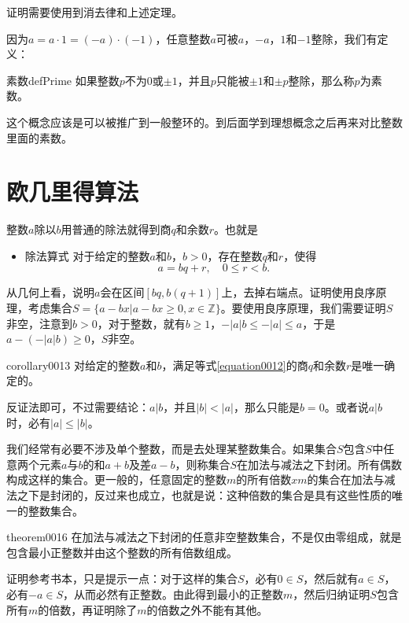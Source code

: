 证明需要使用到消去律和上述定理。

因为$a=a \cdot 1 = (-a) \cdot (-1)$，任意整数$a$可被$a$，$-a$，$1$和$-1$整除，我们有定义：
\begin{definition}{素数}{defPrime}
如果整数$p$不为0或$\pm{}1$，并且$p$只能被$\pm{}1$和$\pm{}p$整除，那么称$p$为素数。
\end{definition}
这个概念应该是可以被推广到一般整环的。到后面学到理想概念之后再来对比整数里面的素数。

\section{欧几里得算法}
整数$a$除以$b$用普通的除法就得到商$q$和余数$r$。也就是
\begin{itemize}
\item \textcolor{main}{除法算式} 对于给定的整数$a$和$b$，$b>0$，存在整数$q$和$r$，使得
\begin{equation}\label{equation0012}
a = bq + r, \quad 0 \le r < b.
\end{equation}
\end{itemize}

从几何上看，说明$a$会在区间$[bq, b(q+1)]$上，去掉右端点。证明使用良序原理，考虑集合$S = \{a-bx|a-bx \ge 0, x \in \mathbb{Z}\}$。要使用良序原理，我们需要证明$S$非空，注意到$b>0$，对于整数，就有$b \ge 1$，$-|a|b \le -|a| \le a$，于是$a - (-|a|b) \ge 0$，$S$非空。

\begin{corollary}{}{corollary0013}
对给定的整数$a$和$b$，满足等式\ref{equation0012}的商$q$和余数$r$是唯一确定的。
\end{corollary}

反证法即可，不过需要结论：$a|b$，并且$|b| < |a|$，那么只能是$b = 0$。或者说$a|b$时，必有$|a| \le |b|$。

我们经常有必要不涉及单个整数，而是去处理某整数集合。如果集合$S$包含$S$中任意两个元素$a$与$b$的和$a+b$及差$a-b$，则称集合$S$在加法与减法之下封闭。所有偶数构成这样的集合。更一般的，任意固定的整数$m$的所有倍数$xm$的集合在加法与减法之下是封闭的，反过来也成立，也就是说：这种倍数的集合是具有这些性质的唯一的整数集合。
\begin{theorem}{}{theorem0016}
在加法与减法之下封闭的任意非空整数集合，不是仅由零组成，就是包含最小正整数并由这个整数的所有倍数组成。
\end{theorem}

证明参考书本，只是提示一点：对于这样的集合$S$，必有$0 \in S$，然后就有$a \in S$，必有$-a \in S$，从而必然有正整数。由此得到最小的正整数$m$，然后归纳证明$S$包含所有$m$的倍数，再证明除了$m$的倍数之外不能有其他。

